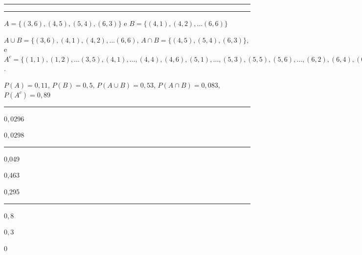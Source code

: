 \documentclass[a4paper,11pt,fleqn]{article}\usepackage[]{graphicx}\usepackage[]{color}
\theoremstyle{definition}
\begin{document}
\begin{compactenum}
\vspace{0.3cm}
\hrule
\vspace{0.3cm}

\clearpage

\vspace{0.3cm}
\hrule
\vspace{0.3cm}

\item
  \begin{compactenum}
  \item $A = \{(3,6), (4,5), (5,4), (6,3)\}$ e $B = \{(4,1), (4,2),
    \ldots (6,6)\}$
  \item $A \cup B = \{(3,6), (4,1), (4,2), \ldots (6,6)$,
    $A \cap B = \{(4,5), (5,4), (6,3)\}$, e \\ $A^{c} = \{(1,1), (1,2),
    \ldots (3,5), (4,1), \ldots, (4,4), (4,6), (5,1), \ldots, (5,3),
    (5,5), (5,6), \ldots, (6,2), (6,4), (6,5), (6.6)\}$.
  \item $P(A) = 0,11$, $P(B) = 0,5$, $P(A \cup B) = 0,53$, $P(A \cap B)
    = 0,083$, $P(A^{c}) = 0,89$
  \end{compactenum}

\vspace{0.3cm}
\hrule
\vspace{0.3cm}

\item
  \begin{inparaenum}
  \item $0,0296$
  \item $0,0298$
  \end{inparaenum}

\vspace{0.3cm}
\hrule
\vspace{0.3cm}

\item
  \begin{inparaenum}
  \item 0,049
  \item 0,463
  \item 0,295
  \end{inparaenum}

\vspace{0.3cm}
\hrule
\vspace{0.3cm}

\item
  \begin{inparaenum}
  \item $0,8$
  \item $0,3$
  \item $0$
  \end{inparaenum}


\end{compactenum}
\end{document}
